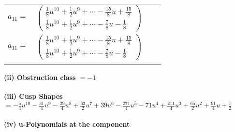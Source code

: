 \documentclass[1p]{elsarticle_modified}
\theoremstyle{definition}
\begin{document}
\begin{tabular}{m{7pt} m{180pt} m{7pt} m{180pt} }
\flushright $a_{11}=$&$\begin{pmatrix}\frac{1}{8} u^{10}+\frac{1}{2} u^9+\cdots-\frac{15}{8} u+\frac{15}{8}\\\frac{1}{8} u^{10}+\frac{1}{2} u^9+\cdots-\frac{7}{8} u-\frac{1}{8}\end{pmatrix}$\\ \flushright $a_{11}=$&$\begin{pmatrix}\frac{1}{8} u^{10}+\frac{1}{2} u^9+\cdots-\frac{15}{8} u+\frac{15}{8}\\\frac{1}{8} u^{10}+\frac{1}{2} u^9+\cdots-\frac{7}{8} u-\frac{1}{8}\end{pmatrix}$\\&\end{tabular}
\flushleft \textbf{(ii) Obstruction class $= -1$}\\~\\
\flushleft \textbf{(iii) Cusp Shapes $= -\frac{5}{4} u^{10}-\frac{31}{4} u^9-\frac{29}{4} u^8+\frac{63}{2} u^7+39 u^6-\frac{271}{4} u^5-71 u^4+\frac{211}{4} u^3+\frac{65}{2} u^2+\frac{91}{4} u+\frac{1}{2}$}\\~\\
\newpage\renewcommand{\arraystretch}{1}
\flushleft \textbf{(iv) u-Polynomials at the component}\newline \\
\end{document}
